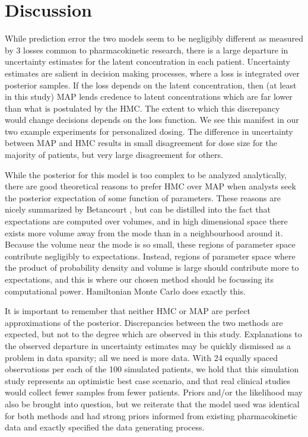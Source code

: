 \section{Discussion}

While prediction error the two models seem to be negligibly different as measured by 3 losses common to pharmacokinetic research, there is a large departure in uncertainty estimates for the latent concentration in each patient.  Uncertainty estimates are salient in decision making processes, where a loss is integrated over posterior samples.  If the loss depends on the latent concentration, then (at least in this study) MAP lends credence to latent concentrations which are far lower than what is postulated by the HMC.  The extent to which this discrepancy would change decisions depends on the loss function. We see this manifest in our two example experiments for personalized dosing.  The difference in uncertainty between MAP and HMC results in small disagreement for dose size for the majority of patients, but very large disagreement for others.

While the posterior for this model is too complex to be analyzed analytically, there are good theoretical reasons to prefer HMC over MAP when analysts seek the posterior expectation of some function of parameters. These reasons are nicely summarized by Betancourt \cite{Betancourt2017-ak}, but can be distilled into the fact that expectations are computed over volumes, and in high dimensional space there exists more volume away from the mode than in a neighbourhood around it. Because the volume near the mode is so small, these regions of parameter space contribute negligibly to expectations.  Instead, regions of parameter space where the product of probability density and volume is large should contribute more to expectations, and this is where our chosen method should be focussing its computational power.  Hamiltonian Monte Carlo does exactly this.

It is important to remember that neither HMC or MAP are perfect approximations of the posterior.  Discrepancies between the two methods are expected, but not to the degree which are observed in this study.  Explanations to the observed departure in uncertainty estimates may be quickly dismissed as a problem in data sparsity; all we need is more data.  With 24 equally spaced observations per each of the 100 simulated patients, we hold that this simulation study represents an optimistic best case scenario, and that real clinical studies would collect fewer samples from fewer patients.  Priors and/or the likelihood may also be brought into question, but we reiterate that the model used was identical for both methods and had strong priors informed from existing pharmacokinetic data and exactly specified the data generating process.

